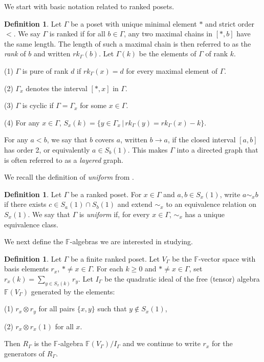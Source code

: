\documentclass[11pt,righttag]{amsart}
\theoremstyle{definition}
\newtheorem{defn}[thm]{Definition}
\begin{document}
We start with basic notation related to ranked posets.

\begin{defn}  
Let $\Gamma$ be a poset with unique minimal element $*$ and strict order $<$.  We say $\Gamma$ is ranked if for all $b\in \Gamma$, any two maximal chains in $[*,b]$ have the same length.  The length of such a maximal chain is then referred to as the  {\it rank} of $b$ and written $rk_\Gamma(b)$.   Let $\Gamma(k)$ be the elements of $\Gamma$ of rank $k$.  

(1) $\Gamma$ is pure of rank $d$ if $rk_\Gamma(x)= d$ for every maximal element of $\Gamma$.  

(2) $\Gamma_x$ denotes the interval $[*,x]$ in $\Gamma$.

(3) $\Gamma$ is cyclic if $\Gamma = \Gamma_x$ for some $x\in \Gamma$.

(4) For any $x\in \Gamma$, $S_x(k) = \{ y\in \Gamma_x\, |\, rk_\Gamma(y) = rk_\Gamma(x) -k \}$.

\noindent For any $a<b$, we say that $b$ covers $a$, written $b\to a$, if the closed interval $[a,b]$ has order 2, or equivalently $a\in S_b(1)$. This makes $\Gamma$ into a directed graph that is often referred to as a {\it layered} graph.
\end{defn}

We recall the definition of {\it uniform} from \cite{GRSW}.

\begin{defn}\label{uniform} 
Let $\Gamma$ be a ranked poset.  For $x\in \Gamma$ and $a,b \in S_x(1)$, write
$a\sim_x b$ if there exists $c\in S_a(1) \cap S_b(1)$ and extend $\sim_x$ to an equivalence relation on $S_x(1)$.   We say that 
$\Gamma$ is {\it uniform} if, for every $x\in \Gamma$, $\sim_x$ has a unique equivalence class.  
\end{defn}

We next define the ${{\mathbb F}}$-algebras we are interested in studying. 

\begin{defn}
Let $\Gamma$ be a finite ranked poset.  Let $V_\Gamma$ be the ${{\mathbb F}}$-vector space with basis elements 
$r_x$, $*\ne x\in \Gamma$.  For each $k\ge 0$ and  $*\ne x\in \Gamma$, set $r_x(k) = \sum\limits_{y\in S_x(k)} r_y$.
Let $I_\Gamma$ be the quadratic ideal of the free (tensor) algebra ${{\mathbb F}}(V_\Gamma)$ generated by the elements:

(1) $r_x \otimes r_y$ for all pairs $\{x,y\}$ such that $y\not\in S_x(1)$,

(2) $r_x \otimes r_x(1)$ for all $x$.

\noindent Then $R_\Gamma$ is the ${{\mathbb F}}$-algebra ${{\mathbb F}}(V_\Gamma)/I_\Gamma$ and we continue to write $r_x$ for the 
generators of $R_\Gamma$.
\end{defn}
\end{document}
